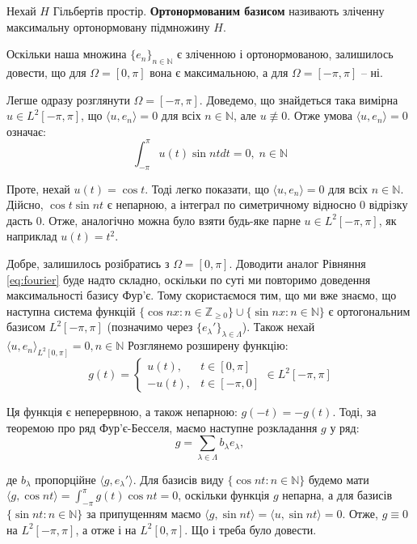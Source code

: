 \documentclass[14pt]{extarticle}
\newcommand{\<}{\langle}
\renewcommand{\>}{\rangle}
\theoremstyle{mystyle}{\newtheorem{definition}{Definition}[section]}
\theoremstyle{mystyle}{\newtheorem{proposition}[definition]{Proposition}}
\theoremstyle{mystyle}{\newtheorem{theorem}[definition]{Theorem}}
\theoremstyle{mystyle}{\newtheorem{lemma}[definition]{Lemma}}
\theoremstyle{mystyle}{\newtheorem{corollary}[definition]{Corollary}}
\theoremstyle{mystyle}{\newtheorem*{remark}{Remark}}
\theoremstyle{mystyle}{\newtheorem*{remarks}{Remarks}}
\theoremstyle{mystyle}{\newtheorem*{example}{Example}}
\theoremstyle{mystyle}{\newtheorem*{examples}{Examples}}
\theoremstyle{definition}{\newtheorem*{exercise}{Exercise}}
\theoremstyle{cstyle}{\newtheorem*{cthm}{}}
\theoremstyle{warn}
\begin{document}
\begin{definition}
    Нехай $H$ Гільбертів простір. \textbf{Ортонормованим базисом} називають зліченну максимальну ортонормовану підмножину $H$.
\end{definition}

Оскільки наша множина $\{e_n\}_{n \in \mathbb{N}}$ є зліченною і ортонормованою, залишилось довести, що для $\Omega=[0,\pi]$ вона є максимальною, а для $\Omega=[-\pi,\pi]$ -- ні. 

Легше одразу розглянути $\Omega = [-\pi,\pi]$. Доведемо, що знайдеться така вимірна $u \in L^2[-\pi,\pi]$, що $\langle u, e_n \rangle = 0$ для всіх $n \in \mathbb{N}$, але $u \not\equiv 0$. Отже умова $\langle u, e_n \rangle = 0$ означає:
\begin{equation}\label{eq:fourier}
    \int_{-\pi}^{\pi}u(t) \sin ntdt = 0, \; n \in \mathbb{N}
\end{equation}

Проте, нехай $u(t) = \cos t$. Тоді легко показати, що $\langle u, e_n \rangle = 0$ для всіх $n \in \mathbb{N}$. Дійсно, $\cos t \sin nt$ є непарною, а інтеграл по симетричному відносно $0$ відрізку дасть $0$. Отже, аналогічно можна було взяти будь-яке парне $u \in L^2[-\pi,\pi]$, як наприклад $u(t)=t^2$.

Добре, залишилось розібратись з $\Omega = [0,\pi]$. Доводити аналог Рівняння \ref{eq:fourier} буде надто складно, оскільки по суті ми повторимо доведення максимальності базису Фур'є. Тому скористаємося тим, що ми вже знаємо, що наступна система функцій $\{\cos nx: n \in \mathbb{Z}_{\geq 0}\} \cup \{\sin nx: n \in \mathbb{N}\}$ є ортогональним базисом $L^2[-\pi,\pi]$ (позначимо через $\{e_{\lambda}'\}_{\lambda \in \Lambda}$). Також нехай $\langle u,e_n \rangle_{L^2[0,\pi]}=0, n \in \mathbb{N}$ Розглянемо розширену функцію:
\begin{equation}
    g(t) = \begin{cases}
        u(t), & t \in [0,\pi] \\
        -u(t), & t \in [-\pi,0]
    \end{cases} \in L^2[-\pi,\pi]
\end{equation}

Ця функція є неперервною, а також непарною: $g(-t)=-g(t)$. Тоді, за теоремою про ряд Фур'є-Бесселя, маємо наступне розкладання $g$ у ряд:
\begin{equation}
    g = \sum_{\lambda \in \Lambda}b_{\lambda}e_{\lambda},
\end{equation}

де $b_{\lambda}$ пропорційне $\langle g,e_{\lambda}'\rangle$. Для базисів виду $\{\cos nt: n \in \mathbb{N}\}$ будемо мати $\langle g, \cos nt \rangle = \int_{-\pi}^{\pi} g(t)\cos nt = 0$, оскільки функція $g$ непарна, а для базисів $\{\sin nt: n \in \mathbb{N}\}$ за припущенням маємо $\langle g, \sin nt \rangle = \langle u, \sin nt \rangle = 0$. Отже, $g \equiv 0$ на $L^2[-\pi,\pi]$, а отже і на $L^2[0,\pi]$. Що і треба було довести.
\end{document}
